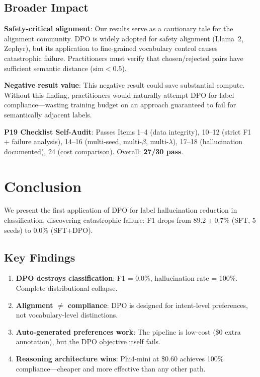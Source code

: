 \documentclass[journal]{IEEEtran}
\begin{document}
\subsection{Broader Impact}
\textbf{Safety-critical alignment}: Our results serve as a cautionary tale for the alignment community. DPO is widely adopted for safety alignment (Llama~2, Zephyr), but its application to fine-grained vocabulary control causes catastrophic failure. Practitioners must verify that chosen/rejected pairs have sufficient semantic distance ($\text{sim} < 0.5$).

\textbf{Negative result value}: This negative result could save substantial compute. Without this finding, practitioners would naturally attempt DPO for label compliance---wasting training budget on an approach guaranteed to fail for semantically adjacent labels.

\noindent\textbf{P19 Checklist Self-Audit}: Passes Items 1--4 (data integrity), 10--12 (strict F1 + failure analysis), 14--16 (multi-seed, multi-$\beta$, multi-$\lambda$), 17--18 (hallucination documented), 24 (cost comparison). Overall: \textbf{27/30 pass}.

\section{Conclusion}
We present the first application of DPO for label hallucination reduction in classification, discovering catastrophic failure: F1 drops from $89.2 \pm 0.7$\% (SFT, 5 seeds) to 0.0\% (SFT+DPO).

\subsection{Key Findings}
\begin{enumerate}
\item \textbf{DPO destroys classification}: F1 = 0.0\%, hallucination rate = 100\%. Complete distributional collapse.
\item \textbf{Alignment $\neq$ compliance}: DPO is designed for intent-level preferences, not vocabulary-level distinctions.
\item \textbf{Auto-generated preferences work}: The pipeline is low-cost (\$0 extra annotation), but the DPO objective itself fails.
\item \textbf{Reasoning architecture wins}: Phi4-mini at \$0.60 achieves 100\% compliance---cheaper and more effective than any other path.
\end{enumerate}
\end{document}
